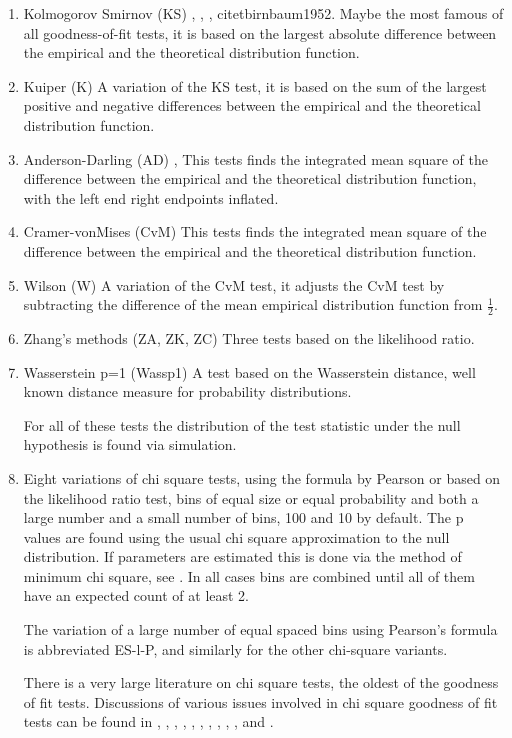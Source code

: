 \documentclass[]{svjour3}
\begin{document}
\begin{enumerate}
\def\labelenumi{\arabic{enumi}.}
\item
  Kolmogorov Smirnov (KS) \citet{massey1951}, \citet{kolmogorov1933}, \citet{smirnov1948}, citet{birnbaum1952}. Maybe the most famous of all goodness-of-fit tests, it is based
  on the largest absolute difference between the empirical and the
  theoretical distribution function.
\item
  Kuiper (K) \citet{kuiper1960} A variation of the KS test, it is based on
  the sum of the largest positive and negative differences between the
  empirical and the theoretical distribution function.
\item
  Anderson-Darling (AD) \citet{anderson1952}, \citet{anderson1954} This tests finds the integrated mean square of the
  difference between the empirical and the theoretical distribution
  function, with the left end right endpoints inflated.
\item
  Cramer-vonMises (CvM) \citet{anderson1962} This tests finds the integrated
  mean square of the difference between the empirical and the
  theoretical distribution function.
\item
  Wilson (W) A variation of the CvM test, it adjusts the CvM test by
  subtracting the difference of the mean empirical distribution function
  from \(\frac12\).
\item
  Zhang's methods (ZA, ZK, ZC) \citet{zhang2002} Three tests based on the
  likelihood ratio.
\item
  Wasserstein p=1 (Wassp1) \citet{wasserstein1999} A test based on the
  Wasserstein distance, well known distance measure for probability
  distributions.

For all of these tests the distribution of the test statistic under the
null hypothesis is found via simulation.

\item
  Eight variations of chi square tests, using the formula by Pearson \citet{pearson1900} or
  based on the likelihood ratio test, bins of equal size or equal
  probability and both a large number and a small number of bins, 100
  and 10 by default. The p values are found using the usual chi square
  approximation to the null distribution. If parameters are estimated
  this is done via the method of minimum chi square, see \citet{berkson1980}.
  In all cases bins are combined until all of them have an expected
  count of at least 2. 
	
  The variation of a large number of equal spaced bins using Pearson's formula is abbreviated ES-l-P, and similarly for the other chi-square variants.

  There is a very large literature on chi square tests, the oldest of the
  goodness of fit tests. Discussions of various issues involved in chi square goodness of fit tests can be found in \citet{bogdan1995}, \citet{dahiya1973}, \citet{gontscharuk2016}, \citet{greenwood1996}, \citet{kallenberg1985}, \citet{koehler1990}, \citet{mineo1979}, \citet{ooosterhoff1985}, \citet{quine1985}, \citet{rolke2020}, \citet{voinov2013} and \citet{watson1958}.
	
\end{enumerate}	
\end{document}
